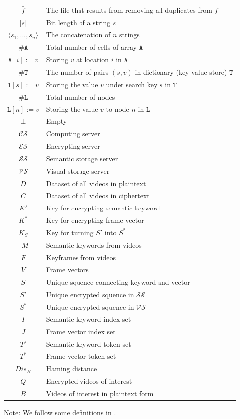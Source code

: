 \documentclass[a4paper,12pt,UTF8]{ctexart}
\begin{document}
\begin{spacing}{1.1}
\begin{center}
\begin{longtable}{cl}
		$\bar{f}$&The file that results from removing all duplicates from $f$\\
		$|s|$&Bit length of a string $s$\\
		$\langle s_1,...,s_n\rangle$&The concatenation of $n$ strings\\
		$\#\mathtt{A}$&Total number of cells of array $\mathtt{A}$\\
		$\mathtt{A}[i]:=v$&Storing $v$ at location $i$ in $\mathtt{A}$\\
		$\#\mathtt{T}$& The number of pairs $(s,v)$ in dictionary (key-value store) $\mathtt{T}$\\ 
		$\mathtt{T}[s]:=v$&Storing the value $v$ under search key $s$ in $\mathtt{T}$\\
		$\#\mathtt{L}$& Total number of nodes \\
		$\mathtt{L}[n]:=v$&Storing the value $v$ to node $n$ in $\mathtt{L}$ \\
    	$\bot$&Empty\\
		$\mathcal{CS}$&Computing server\\
		$\mathcal{ES}$&Encrypting server\\
		$\mathcal{SS}$&Semantic storage server\\
		$\mathcal{VS}$&Visual storage server\\
		$D$        & Dataset of all videos in plaintext \\
		$C$        & Dataset of all videos in ciphertext \\
		$K'$       & Key for encrypting semantic keyword\\ 
		$K^*$      & Key for encrypting frame vector\\ 
		$K_S$      & Key for turning $S'$ into $S^*$\\ \ 
		$M$        & Semantic keywords from videos \\ 
		$F$        & Keyframes from videos  \\ 
		$V$        & Frame vectors  \\ 
		$S$        & Unique squence connecting keyword and vector \\
		$S'$       & Unique encrypted squence in $\mathcal{SS}$\\
		$S^*$      & Unique encrypted squence in $\mathcal{VS}$\\
		$I$        & Semantic keyword index set\\ 
		$J$        & Frame vector index set\\ 
		$T'$       & Semantic keyword token set\\ 
		$T^*$      & Frame vector token set\\ 
		$Dis_H$    & Haming distance \\
		$Q$        & Encrypted videos of interest\\
		$B$        & Videos of interest in plaintext form\\
	\end{longtable} 
\end{center}
Note: We follow some definitions in \cite{DBLP:conf/ccs/KamaraPR12}. 


\end{spacing}
\end{document}
